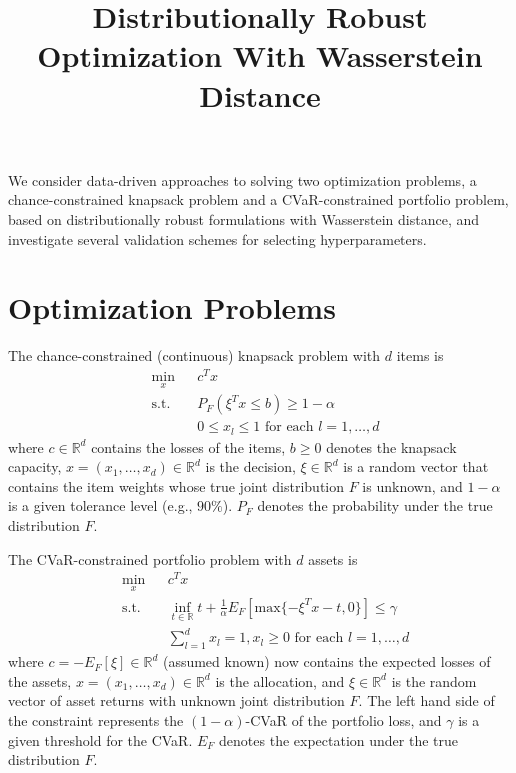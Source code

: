 \documentclass[11pt]{article}
\newcommand{\R}{\mathbb{R}}
\begin{document}
\title{Distributionally Robust Optimization With Wasserstein Distance}
\date{}
\maketitle
We consider data-driven approaches to solving two optimization problems, a chance-constrained knapsack problem and a CVaR-constrained portfolio problem, based on distributionally robust formulations with Wasserstein distance, and investigate several validation schemes for selecting hyperparameters.

\section{Optimization Problems}
The chance-constrained (continuous) knapsack problem with $d$ items is
\begin{equation}\label{ccp}
\begin{aligned}
& \underset{x}{\text{min}}
& & c^Tx \\
& \text{s.t.}
& & P_F(\xi^Tx\leq b)\geq 1-\alpha\\
&& & 0\leq x_l\leq 1\text{ for each }l=1,\ldots,d
\end{aligned}
\end{equation}
where $c\in \R^d$ contains the losses of the items, $b\geq 0$ denotes the knapsack capacity, $x=(x_1,\ldots,x_d)\in\R^d$ is the decision, $\xi\in\R^d$ is a random vector that contains the item weights whose true joint distribution $F$ is unknown, and $1-\alpha$ is a given tolerance level (e.g., $90\%$). $P_F$ denotes the probability under the true distribution $F$.

The CVaR-constrained portfolio problem with $d$ assets is
\begin{equation}\label{cvar}
\begin{aligned}
& \underset{x}{\text{min}}
& & c^Tx \\
& \text{s.t.}
& & \inf_{t\in\R}t+\frac{1}{\alpha}E_F[\text{max}\{-\xi^Tx-t,0\}]\leq \gamma\\
&& & \sum_{l=1}^dx_l=1,x_l\geq 0\text{ for each }l=1,\ldots,d
\end{aligned}
\end{equation}
where $c=-E_F[\xi]\in\R^d$ (assumed known) now contains the expected losses of the assets, $x=(x_1,\ldots,x_d)\in\R^d$ is the allocation, and $\xi\in\R^d$ is the random vector of asset returns with unknown joint distribution $F$. The left hand side of the constraint represents the $(1-\alpha)$-CVaR of the portfolio loss, and $\gamma$ is a given threshold for the CVaR. $E_F$ denotes the expectation under the true distribution $F$.
\end{document}
